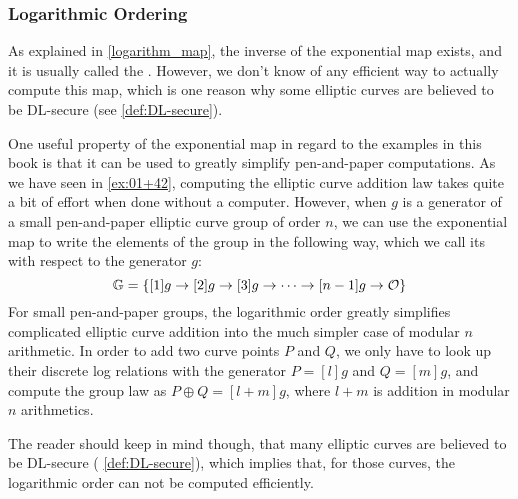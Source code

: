 \subsubsection{Logarithmic Ordering}
\label{def:logarithmic_ordering}
As explained in \eqref{logarithm_map}, the inverse of the exponential map exists, and it is usually called the . However, we don't know of any efficient way to actually compute this map, which is one reason why some elliptic curves are believed to be DL-secure (see  \ref{def:DL-secure}).

One useful property of the exponential map in regard to the examples in this book is that it can be used to greatly simplify pen-and-paper computations. As we have seen in \examplename{} \ref{ex:01+42}, computing the elliptic curve addition law takes quite a bit of effort when done without a computer. However, when $g$ is a generator of a small pen-and-paper elliptic curve group of order $n$, we can use the exponential map to write the elements of the group in the following way, which we call its  with respect to the generator $g$:
\begin{equation}\label{def:logarithmic_order}
\mathbb{G} = \{[1]g\to [2]g \to [3]g\to\cdots\to [n-1]g\to \mathcal{O}\}
\end{equation} 
For small pen-and-paper groups, the logarithmic order greatly simplifies complicated elliptic curve addition into the much simpler case of modular $n$ arithmetic. In order to add two curve points $P$ and $Q$, we only have to look up their discrete log relations with the generator $P=[l]g$ and $Q=[m]g$, and compute the group law as $P\oplus Q = [l+m]g$, where $l+m$ is addition in modular $n$ arithmetics. 

The reader should keep in mind though, that many elliptic curves are believed to be DL-secure ( \ref{def:DL-secure}), which implies that, for those curves, the logarithmic order can not be computed efficiently.  


